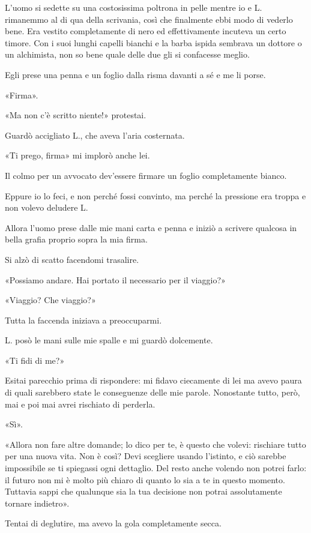 \documentclass[a4paper,10pt]{memoir}
\begin{document}
L'uomo si sedette su una costosissima poltrona in pelle mentre io e L. rimanemmo al di qua della scrivania, così che
finalmente ebbi modo di vederlo bene. Era vestito completamente di nero ed effettivamente incuteva un certo timore. Con
i suoi lunghi capelli bianchi e la barba ispida sembrava un dottore o un alchimista, non so bene quale delle due gli si
confacesse meglio.

Egli prese una penna e un foglio dalla risma davanti a sé e me li porse.

«Firma».

«Ma non c'è scritto niente!» protestai.

Guardò accigliato L., che aveva l'aria costernata.

«Ti prego, firma» mi implorò anche lei.

Il colmo per un avvocato dev'essere firmare un foglio completamente bianco.

Eppure io lo feci, e non perché fossi convinto, ma perché la pressione era troppa e non volevo deludere L.

Allora l'uomo prese dalle mie mani carta e penna e iniziò a scrivere qualcosa in bella grafia proprio sopra la mia
firma.

Si alzò di scatto facendomi trasalire.

«Possiamo andare. Hai portato il necessario per il viaggio?»

«Viaggio? Che viaggio?»

Tutta la faccenda iniziava a preoccuparmi.

L. posò le mani sulle mie spalle e mi guardò dolcemente.

«Ti fidi di me?»

Esitai parecchio prima di rispondere: mi fidavo ciecamente di lei ma avevo paura di quali sarebbero state le conseguenze
delle mie parole. Nonostante tutto, però, mai e poi mai avrei rischiato di perderla.

«Sì».

«Allora non fare altre domande; lo dico per te, è questo che volevi: rischiare tutto per una nuova vita. Non è così?
Devi scegliere usando l'istinto, e ciò sarebbe impossibile se ti spiegassi ogni dettaglio. Del resto anche volendo non
potrei farlo: il futuro non mi è molto più chiaro di quanto lo sia a te in questo momento. Tuttavia sappi che qualunque
sia la tua decisione non potrai assolutamente tornare indietro».

Tentai di deglutire, ma avevo la gola completamente secca.
\end{document}
